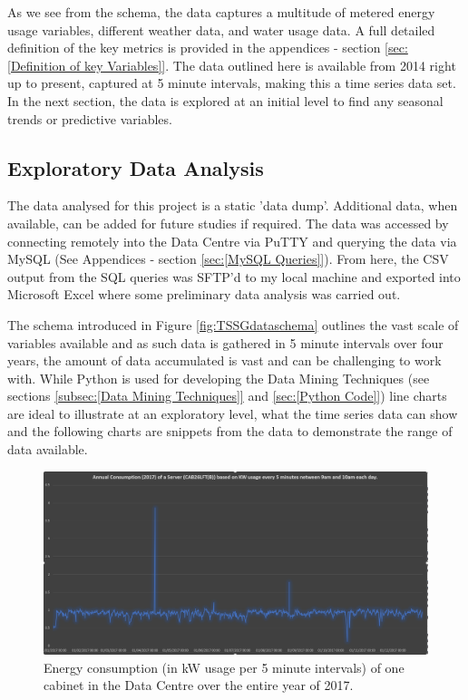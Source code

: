 \documentclass[12pt]{scrartcl}
\begin{document}
 

As we see from the schema, the data captures a multitude of metered energy usage variables, different weather data, and water usage data. A full detailed definition of the key metrics is provided in the appendices - section \ref{sec:[Definition of key Variables]}. The data outlined here is available from 2014 right up to present, captured at 5 minute intervals, making this a time series data set. In the next section, the data is explored at an initial level to find any seasonal trends or predictive variables.
 
\subsection{Exploratory Data Analysis}
\label{subsec:[Exploratory Data Analysis]}
The data analysed for this project is a static 'data dump'. Additional data, when available, can be added for future studies if required. The data was accessed by connecting remotely into the Data Centre via PuTTY and querying the data via MySQL (See Appendices - section \ref{sec:[MySQL Queries]}). From here, the CSV output from the SQL queries was SFTP'd to my local machine and exported into Microsoft Excel where some preliminary data analysis was carried out. 

The schema introduced in Figure \ref{fig:TSSGdataschema} outlines the vast scale of variables available and as such data is gathered in 5 minute intervals over four years, the amount of data accumulated is vast and can be challenging to work with. While Python is used for developing the Data Mining Techniques (see sections \ref{subsec:[Data Mining Techniques]} and \ref{sec:[Python Code]}) line charts are ideal to illustrate at an exploratory level, what the time series data can show and the following charts are snippets from the data to demonstrate the range of data available.

\begin{figure}[H]
  \caption{Energy consumption (in kW usage per 5 minute intervals) of one cabinet in the Data Centre over the entire year of 2017.}
  \label{fig:Annualenergyfigure}
  \centering
    \includegraphics[scale=0.30]{Annual_energy_consumption}
\end{figure}
\end{document}
